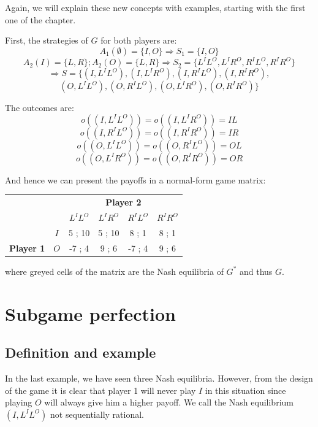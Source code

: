 \documentclass[12pt]{report}
\begin{document}
Again, we will explain these new concepts with examples, starting with the first one of the chapter. 

First, the strategies of $G$ for both players are: $$A_1(\emptyset) = \{I, O\} \Rightarrow S_1 = \{I, O\} $$ $$A_2(I) = \{L, R\} ; A_2(O) = \{L, R\} \Rightarrow S_2 = \{L^IL^O, L^IR^O, R^IL^O, R^IR^O\} $$ $$\Rightarrow S = \{(I,L^IL^O), (I,L^IR^O), (I,R^IL^O), (I,R^IR^O), $$ $$ (O,L^IL^O), (O,R^IL^O), (O,L^IR^O), (O,R^IR^O)\} $$

The outcomes are: $$o((I,L^IL^O)) = o((I,L^IR^O)) = IL $$ $$o((I,R^IL^O)) = o((I,R^IR^O)) = IR $$ $$o((O,L^IL^O)) = o((O,R^IL^O)) = OL $$ $$o((O,L^IR^O)) = o((O,R^IR^O)) = OR $$

And hence we can present the payoffs in a normal-form game matrix: \begin{table}[ht!]
\centering
\begin{tabular}{cccccc}
 &  & \multicolumn{4}{c}{\textbf{Player 2}} \\ \cline{3-6} 
 & \multicolumn{1}{c|}{} & \multicolumn{1}{c|}{$L^IL^O$} & \multicolumn{1}{c|}{$L^IR^O$} & \multicolumn{1}{c|}{$R^IL^O$} & \multicolumn{1}{c|}{$R^IR^O$} \\ \cline{2-6} 
\multicolumn{1}{c|}{} & \multicolumn{1}{c|}{$I$} & \multicolumn{1}{c|}{\cellcolor[HTML]{C0C0C0}5 ; 10} & \multicolumn{1}{c|}{5 ; 10} & \multicolumn{1}{c|}{8 ; 1} & \multicolumn{1}{c|}{8 ; 1} \\ \cline{2-6} 
\multicolumn{1}{c|}{\multirow{-2}{*}{\textbf{Player 1}}} & \multicolumn{1}{c|}{$O$} & \multicolumn{1}{c|}{-7 ; 4} & \multicolumn{1}{c|}{\cellcolor[HTML]{C0C0C0}9 ; 6} & \multicolumn{1}{c|}{-7 ; 4} & \multicolumn{1}{c|}{\cellcolor[HTML]{C0C0C0}9 ; 6} \\ \cline{2-6} 
\end{tabular}
\end{table}

where greyed cells of the matrix are the Nash equilibria of $G^*$ and thus $G$.

\section{Subgame perfection}

\subsection{Definition and example}

In the last example, we have seen three Nash equilibria. However, from the design of the game it is clear that player 1 will never play $I$ in this situation since playing $O$ will always give him a higher payoff. We call the Nash equilibrium $(I, L^IL^O)$ not sequentially rational.
\end{document}
